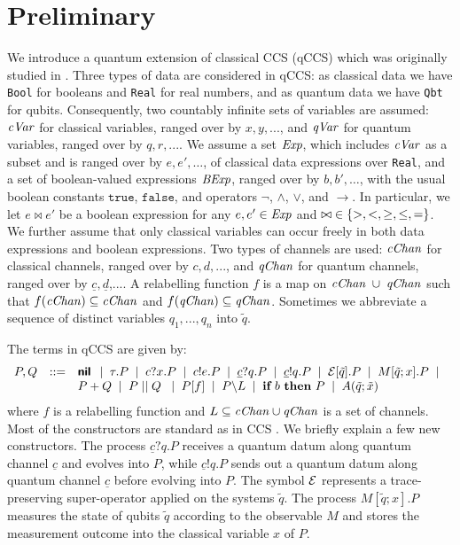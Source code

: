 \documentclass[runningheads]{llncs}
\def\ra{\ensuremath{\rightarrow}}
\newcommand{\qc}{\underline{c}}
\newcommand{\qd}{\underline{d}}
\newcommand{\cVar}{{\it cVar}}
\newcommand{\qVar}{{\it qVar}}
\newcommand{\cChan}{{\it cChan}}
\newcommand{\qChan}{{\it qChan}}
\newcommand{\CE}{{\cal E}}
\newcommand{\ifthen}[2]{{\textbf{if} ~#1~ \textbf{then} ~#2}}
\begin{document}
\section{Preliminary}
\label{sec:qccs}
We introduce a quantum extension of classical CCS (qCCS) which was originally studied in \cite{FDJY07,YFDJ09,FDY11}. Three types of data are considered in qCCS: as classical data we have \texttt{Bool} for booleans and \texttt{Real} for real numbers, and as quantum data we have \texttt{Qbt} for qubits. Consequently,
two countably infinite sets of variables are assumed: $\cVar$ for classical variables, ranged over by $x,y,...$, and $\qVar$ for quantum variables, ranged over by $q,r,...$.
We assume a set ${\it Exp}$, which includes $\cVar$ as a subset and is ranged over by $e,e',\dots$,  of classical data expressions over
\texttt{Real}, and a set of boolean-valued expressions ${\it BExp}$, ranged over by $b, b',\dots$, with the usual boolean constants $\texttt{true}$, $\texttt{false}$, and operators
$\neg$, $\wedge$, $\vee$, and $\ra$. In particular, we let $e\bowtie e'$ be a boolean expression for any $e,e'\in {\it Exp}$ and ${\bowtie} \in\{ {>, <, \geq, \leq, =} \}$.
We further assume that only classical variables can occur freely in both data expressions and boolean expressions.
Two types of channels are used: $\cChan$ for classical channels, ranged over by $c,d,...$, and $\qChan$ for quantum channels, ranged over by $\qc,\qd$,.... A relabelling function $f$ is a map on $\cChan\; \cup\; \qChan$ such that $f(\cChan)\subseteq \cChan$ and $f(\qChan)\subseteq \qChan$.
Sometimes we abbreviate a sequence of distinct variables $q_1,...,q_n$ into $\tilde{q}$.

The terms in qCCS are given by:
\[\begin{array}{rcl}
P,Q &::=& \Cnil \BNFsep \tau.P \BNFsep c?x.P \BNFsep c!e.P
\BNFsep \qc?q.P \BNFsep
\qc!q.P \BNFsep \CE[\tilde{q}].P
\BNFsep M[\tilde{q};x].P \BNFsep \\
& & P + Q \BNFsep  P \Cpar Q\;
\BNFsep P[f] \BNFsep P\backslash L \BNFsep \ifthen{b}{P} \BNFsep
A(\tilde{q};\tilde{x})
\end{array}\]
where $f$ is a relabelling function and $L\subseteq \cChan\cup \qChan$ is a set of channels.
Most of the constructors are standard as in CCS \cite{ccs}.
We briefly explain a few new constructors. The process $\qc?q.P$ receives a quantum datum along quantum channel $\qc$ and evolves into $P$, while $\qc!q.P$ sends out a quantum datum along quantum channel $\qc$ before evolving into $P$. The symbol $\CE$ represents a trace-preserving super-operator applied on the systems $\tilde{q}$. The process $M[\tilde{q};x].P$ measures the state of qubits $\tilde{q}$
according to the observable $M$ and stores the measurement outcome into the
classical variable $x$ of $P$.
\end{document}
